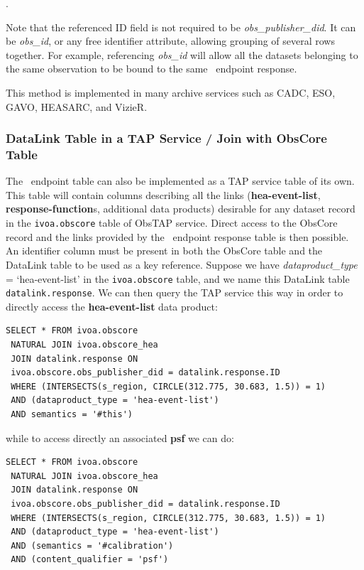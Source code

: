 .

\noindent Note that the referenced ID field is not required to be  {\em obs\_publisher\_did\/}. It can be  {\em obs\_id\/}, or any free identifier attribute, allowing grouping of several rows together. For example, referencing {\em obs\_id\/} will allow all the datasets belonging to the same observation to be bound to the same \blinks\ endpoint response.

This method is implemented in many archive services such as CADC, ESO, GAVO, HEASARC, and VizieR.

 \subsubsection{DataLink Table in a TAP  Service / Join with ObsCore Table}
 \label{sec:datalinktap}

The \blinks\ endpoint table can also be implemented as a TAP service table of its own. This table will contain  columns describing  all the links ({\bf hea-event-list}, {\bf response-function}s, additional data products) desirable for any dataset record in the {\tt ivoa.obscore} table of ObsTAP service.
Direct access to the ObsCore record and the links provided by the \blinks\ endpoint response table is then possible. An identifier column must be present in both the ObsCore table and the DataLink table to be used as a key reference. Suppose we have  {\em dataproduct\_type} = `hea-event-list' in the {\tt ivoa.obscore} table, and we name this DataLink table {\tt datalink.response}\null. We can then query the TAP service this way in order to directly access the {\bf hea-event-list} data product:

\smallskip
{\small
\begin{verbatim}
SELECT * FROM ivoa.obscore
 NATURAL JOIN ivoa.obscore_hea
 JOIN datalink.response ON
 ivoa.obscore.obs_publisher_did = datalink.response.ID
 WHERE (INTERSECTS(s_region, CIRCLE(312.775, 30.683, 1.5)) = 1)
 AND (dataproduct_type = 'hea-event-list')
 AND semantics = '#this')
\end{verbatim}
}

\noindent while to access directly an associated {\bf psf} we can do:

{\small
\begin{verbatim}
SELECT * FROM ivoa.obscore
 NATURAL JOIN ivoa.obscore_hea
 JOIN datalink.response ON
 ivoa.obscore.obs_publisher_did = datalink.response.ID
 WHERE (INTERSECTS(s_region, CIRCLE(312.775, 30.683, 1.5)) = 1)
 AND (dataproduct_type = 'hea-event-list')
 AND (semantics = '#calibration')
 AND (content_qualifier = 'psf')
\end{verbatim}
}

